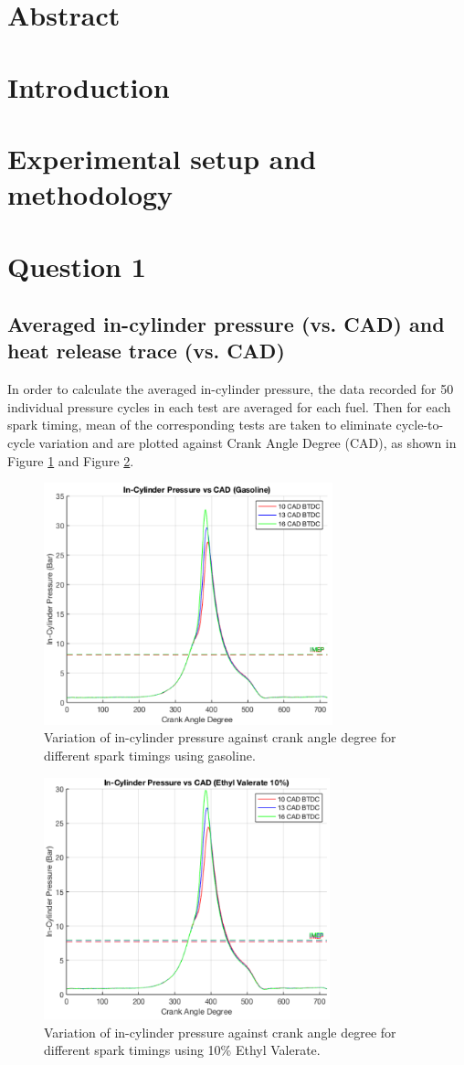 \documentclass[11pt]{article}
\begin{document}
\section*{Abstract}
\section*{Introduction}
\section*{Experimental setup and methodology}
\section*{Question 1}
\subsection*{Averaged in-cylinder pressure (vs. CAD) and heat release trace (vs. CAD)}
In order to calculate the averaged in-cylinder pressure, the data recorded for 50 individual pressure cycles in each test are averaged for each fuel. Then for each spark timing, mean of the corresponding tests are taken to eliminate cycle-to-cycle variation and are plotted against Crank Angle Degree (CAD), as shown in Figure \ref{q1-f1} and Figure \ref{q1-f2}. 
\begin{figure}[H]
    \centering
    \includegraphics[height = 7cm]{./img/diagram8.png}
    \caption{Variation of in-cylinder pressure against crank angle degree for different spark timings using gasoline.}
    \label{q1-f1}
\end{figure}
\begin{figure}[H]
    \centering
    \includegraphics[height = 7cm]{./img/diagram9.png}
    \caption{Variation of in-cylinder pressure against crank angle degree for different spark timings using 10\% Ethyl Valerate.}
    \label{q1-f2}
\end{figure}
\end{document}
